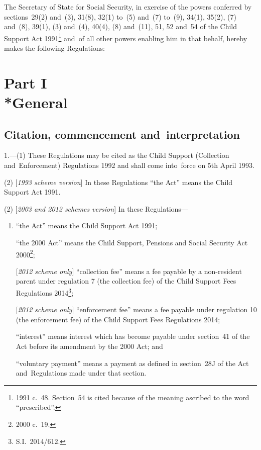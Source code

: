 \documentclass[12pt,a4paper]{article}
\title{\regstitle}
\author{S.I.~1992 No.~1989}
\date{Made 17th August 1992\\Laid before Parliament 26th August 1992\\Coming into~force 5th April 1993}
\begin{document}
\maketitle

\noindent
The Secretary of State for Social Security, in exercise of the powers conferred by sections~29(2) and~(3), 31(8), 32(1) to~(5) and~(7) to~(9), 34(1), 35(2), (7) and~(8), 39(1), (3) and~(4), 40(4), (8) and~(11), 51, 52 and~54 of the Child Support Act 1991\footnote{1991 c.~48. Section~54 is cited because of the meaning ascribed to the word “prescribed”.} and~of all other powers enabling him in that behalf, hereby makes the following Regulations:

{\sloppy

\tableofcontents

}

\setcounter{secnumdepth}{-2}

\section[Part I --- General]{Part I\\*General}

\subsection[1. Citation, commencement and~interpretation]{Citation, commencement and~interpretation}

\renewcommand\parthead{--- Part I}

1.—(1) These Regulations may be cited as the Child Support (Collection and~Enforcement) Regulations 1992 and shall come into~force on 5th April 1993.

(2) [\emph{1993 scheme version}] In these Regulations “the Act” means the Child Support Act 1991.

(2) [\emph{2003 and 2012 schemes version}] In these Regulations—
\begin{enumerate}\item[]
“the Act” means the Child Support Act 1991;

“the 2000 Act” means the Child Support, Pensions and Social Security Act 2000\footnote{2000 c.~19.};

[\emph{2012 scheme only}] “collection fee” means a fee payable by a non-resident parent under regulation 7 (the collection fee) of the Child Support Fees Regulations 2014\footnote{S.I.~2014/612.};

[\emph{2012 scheme only}] “enforcement fee” means a fee payable under regulation 10 (the enforcement fee) of the Child Support Fees Regulations 2014;

“interest” means interest which has become payable under section~41 of the Act before its amendment by the 2000 Act; and

“voluntary payment” means a payment as defined in section~28J of the Act and~Regulations made under that section.
\end{enumerate}
\end{document}

